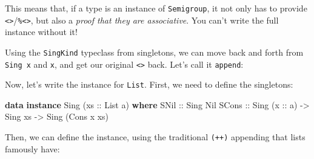 \documentclass[]{article}
\newenvironment{Shaded}{}{}
\newcommand{\KeywordTok}[1]{\textcolor[rgb]{0.00,0.44,0.13}{\textbf{{#1}}}}
\newcommand{\DataTypeTok}[1]{\textcolor[rgb]{0.56,0.13,0.00}{{#1}}}
\newcommand{\OtherTok}[1]{\textcolor[rgb]{0.00,0.44,0.13}{{#1}}}
\newcommand{\FunctionTok}[1]{\textcolor[rgb]{0.02,0.16,0.49}{{#1}}}
\newcommand{\NormalTok}[1]{{#1}}
\begin{document}
This means that, if a type is an instance of \texttt{Semigroup}, it not only has
to provide
\texttt{\textless{}\textgreater{}}/\texttt{\%\textless{}\textgreater{}}, but
also a \emph{proof that they are associative}. You can't write the full instance
without it!

Using the \texttt{SingKind} typeclass from singletons, we can move back and
forth from \texttt{Sing\ x} and \texttt{x}, and get our original
\texttt{\textless{}\textgreater{}} back. Let's call it \texttt{append}:

\begin{Shaded}
\end{Shaded}

Now, let's write the instance for \texttt{List}. First, we need to define the
singletons:

\begin{Shaded}
\begin{Highlighting}[]
\KeywordTok{data} \KeywordTok{instance} \DataTypeTok{Sing} \NormalTok{(}\OtherTok{xs ::} \DataTypeTok{List} \NormalTok{a) }\KeywordTok{where}
    \DataTypeTok{SNil}\OtherTok{  ::} \DataTypeTok{Sing} \DataTypeTok{Nil}
    \DataTypeTok{SCons}\OtherTok{ ::} \DataTypeTok{Sing} \NormalTok{(}\OtherTok{x ::} \NormalTok{a) }\OtherTok{->} \DataTypeTok{Sing} \NormalTok{xs }\OtherTok{->} \DataTypeTok{Sing} \NormalTok{(}\DataTypeTok{Cons} \NormalTok{x xs)}
\end{Highlighting}
\end{Shaded}

Then, we can define the instance, using the traditional \texttt{(++)} appending
that lists famously have:
\end{document}
